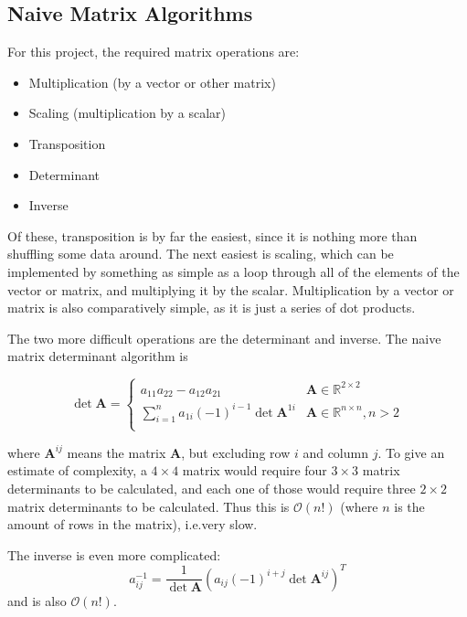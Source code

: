 \documentclass[12pt]{article}
\begin{document}
\subsection{Naive Matrix Algorithms}
\label{naive}

For this project, the required matrix operations are:

\begin{itemize}
	\item Multiplication (by a vector or other matrix)
	\item Scaling (multiplication by a scalar)
	\item Transposition
	\item Determinant
	\item Inverse
\end{itemize}

Of these, transposition is by far the easiest, since it is nothing more than shuffling some data around. The next easiest is scaling, which can be implemented by something as simple as a loop through all of the elements of the vector or matrix, and multiplying it by the scalar. Multiplication by a vector or matrix is also comparatively simple, as it is just a series of dot products.

The two more difficult operations are the determinant and inverse. The naive matrix determinant algorithm \cite{strang2006linear} is

\begin{equation}
	\det{\mathbf{A}} = 
	\begin{cases}
	a_{11}a_{22} - a_{12}a_{21}& \mathbf{A} \in \mathbb{R}^{2 \times 2}\\
	\sum_{i=1}^{n} a_{1i}  (-1)^{i-1}\det{\mathbf{A}^{1i}} & \mathbf{A} \in \mathbb{R}^{n \times n}, n > 2\\
	\end{cases}
\end{equation}

\noindent
where $\mathbf{A}^{ij}$ means the matrix $\mathbf{A}$, but excluding row $i$ and column $j$. To give an estimate of complexity, a $4\times4$ matrix would require four $3\times3$ matrix determinants to be calculated, and each one of those would require three $2\times2$ matrix determinants to be calculated. Thus this is $\mathcal{O}(n!)$ (where $n$ is the amount of rows in the matrix), i.e.\@ very slow.

The inverse is even more complicated:
\begin{equation}
	a^{-1}_{ij} = \frac{1}{\det{\mathbf{A}}} \left(a_{ij} (-1)^{i+j} \det{\mathbf{A}^{ij}}\right)^T
\end{equation}
\noindent
and is also $\mathcal{O}(n!)$.
\end{document}
